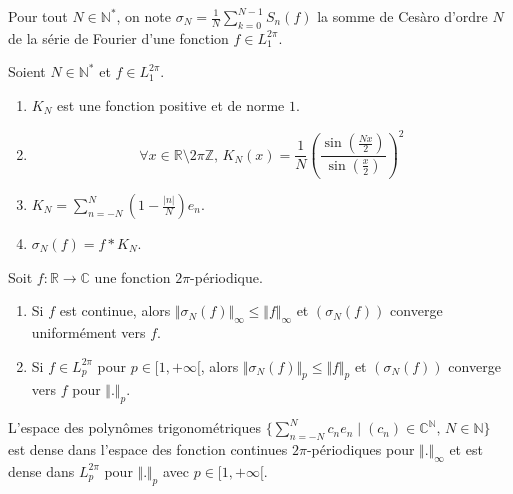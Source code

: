   \begin{notation}
    Pour tout $N \in \mathbb{N}^*$, on note $\sigma_N = \frac{1}{N} \sum_{k=0}^{N-1} S_n(f)$ la somme de Cesàro d'ordre $N$ de la série de Fourier d'une fonction $f \in L_1^{2 \pi}$.
  \end{notation}

  \begin{proposition}
    Soient $N \in \mathbb{N}^*$ et $f \in L_1^{2 \pi}$.
    \begin{enumerate}[label=(\roman*)]
      \item $K_N$ est une fonction positive et de norme $1$.
      \item \[ \forall x \in \mathbb{R} \setminus 2 \pi \mathbb{Z}, \, K_N(x) = \frac{1}{N} \left(\frac{\sin \left( \frac{Nx}{2} \right)}{\sin \left( \frac{x}{2} \right)}\right)^2 \]
      \item $K_N = \sum_{n=-N}^{N} \left(1 - \frac{\vert n \vert}{N}\right) e_n$.
      \item $\sigma_N(f) = f * K_N$.
    \end{enumerate}
  \end{proposition}


  \begin{theorem}[Fejér]
    Soit $f : \mathbb{R} \rightarrow \mathbb{C}$ une fonction $2\pi$-périodique.
    \begin{enumerate}[label=(\roman*)]
      \item Si $f$ est continue, alors $\Vert \sigma_N(f) \Vert_\infty \leq \Vert f \Vert_\infty$ et $(\sigma_N(f))$ converge uniformément vers $f$.
      \item Si $f \in L_p^{2\pi}$ pour $p \in [1,+\infty[$, alors $\Vert \sigma_N(f) \Vert_p \leq \Vert f \Vert_p$ et $(\sigma_N(f))$ converge vers $f$ pour $\Vert . \Vert_p$.
    \end{enumerate}
  \end{theorem}

  \begin{corollary}
    L'espace des polynômes trigonométriques $\{ \sum_{n=-N}^N c_n e_n \mid (c_n) \in \mathbb{C}^{\mathbb{N}}, \, N \in \mathbb{N} \}$ est dense dans l'espace des fonction continues $2\pi$-périodiques pour $\Vert . \Vert_\infty$ et est dense dans $L_p^{2\pi}$ pour $\Vert . \Vert_p$ avec $p \in [1,+\infty[$.
  \end{corollary}


